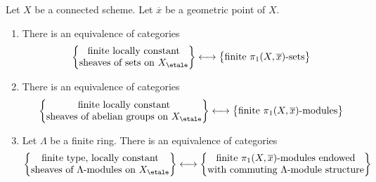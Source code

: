 \begin{lemma}
\label{lemma-locally-constant-on-connected}
Let $X$ be a connected scheme. Let $\overline{x}$ be a geometric point of $X$.
\begin{enumerate}
\item There is an equivalence of categories
$$
\left\{
\begin{matrix}
\text{finite locally constant}\\
\text{sheaves of sets on }X_\etale
\end{matrix}
\right\}
\longleftrightarrow
\left\{
\begin{matrix}
\text{finite }\pi_1(X, \overline{x})\text{-sets}
\end{matrix}
\right\}
$$
\item There is an equivalence of categories
$$
\left\{
\begin{matrix}
\text{finite locally constant}\\
\text{sheaves of abelian groups on }X_\etale
\end{matrix}
\right\}
\longleftrightarrow
\left\{
\begin{matrix}
\text{finite }\pi_1(X, \overline{x})\text{-modules}
\end{matrix}
\right\}
$$
\item Let $\Lambda$ be a finite ring. There is an equivalence of categories
$$
\left\{
\begin{matrix}
\text{finite type, locally constant}\\
\text{sheaves of }\Lambda\text{-modules on }X_\etale
\end{matrix}
\right\}
\longleftrightarrow
\left\{
\begin{matrix}
\text{finite }\pi_1(X, \overline{x})\text{-modules endowed}\\
\text{with commuting }\Lambda\text{-module structure}
\end{matrix}
\right\}
$$
\end{enumerate}
\end{lemma}


